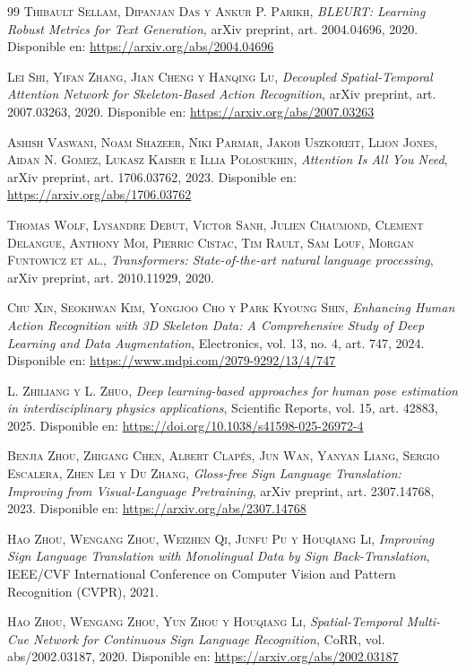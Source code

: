 \begin{thebibliography}{99}
 \textsc{Thibault Sellam, Dipanjan Das y Ankur P. Parikh}, \textit{BLEURT: Learning Robust Metrics for Text Generation}, arXiv preprint, art. 2004.04696, 2020. Disponible en: \url{https://arxiv.org/abs/2004.04696}

 \textsc{Lei Shi, Yifan Zhang, Jian Cheng y Hanqing Lu}, \textit{Decoupled Spatial-Temporal Attention Network for Skeleton-Based Action Recognition}, arXiv preprint, art. 2007.03263, 2020. Disponible en: \url{https://arxiv.org/abs/2007.03263}

 \textsc{Ashish Vaswani, Noam Shazeer, Niki Parmar, Jakob Uszkoreit, Llion Jones, Aidan N. Gomez, Lukasz Kaiser e Illia Polosukhin}, \textit{Attention Is All You Need}, arXiv preprint, art. 1706.03762, 2023. Disponible en: \url{https://arxiv.org/abs/1706.03762}

 \textsc{Thomas Wolf, Lysandre Debut, Victor Sanh, Julien Chaumond, Clement Delangue, Anthony Moi, Pierric Cistac, Tim Rault, Sam Louf, Morgan Funtowicz et al.}, \textit{Transformers: State-of-the-art natural language processing}, arXiv preprint, art. 2010.11929, 2020.

 \textsc{Chu Xin, Seokhwan Kim, Yongjoo Cho y Park Kyoung Shin}, \textit{Enhancing Human Action Recognition with 3D Skeleton Data: A Comprehensive Study of Deep Learning and Data Augmentation}, Electronics, vol. 13, no. 4, art. 747, 2024. Disponible en: \url{https://www.mdpi.com/2079-9292/13/4/747}

 \textsc{L. Zhiliang y L. Zhuo}, \textit{Deep learning-based approaches for human pose estimation in interdisciplinary physics applications}, Scientific Reports, vol. 15, art. 42883, 2025. Disponible en: \url{https://doi.org/10.1038/s41598-025-26972-4}

 \textsc{Benjia Zhou, Zhigang Chen, Albert Clapés, Jun Wan, Yanyan Liang, Sergio Escalera, Zhen Lei y Du Zhang}, \textit{Gloss-free Sign Language Translation: Improving from Visual-Language Pretraining}, arXiv preprint, art. 2307.14768, 2023. Disponible en: \url{https://arxiv.org/abs/2307.14768}

 \textsc{Hao Zhou, Wengang Zhou, Weizhen Qi, Junfu Pu y Houqiang Li}, \textit{Improving Sign Language Translation with Monolingual Data by Sign Back-Translation}, IEEE/CVF International Conference on Computer Vision and Pattern Recognition (CVPR), 2021.

 \textsc{Hao Zhou, Wengang Zhou, Yun Zhou y Houqiang Li}, \textit{Spatial-Temporal Multi-Cue Network for Continuous Sign Language Recognition}, CoRR, vol. abs/2002.03187, 2020. Disponible en: \url{https://arxiv.org/abs/2002.03187}

\end{thebibliography}

